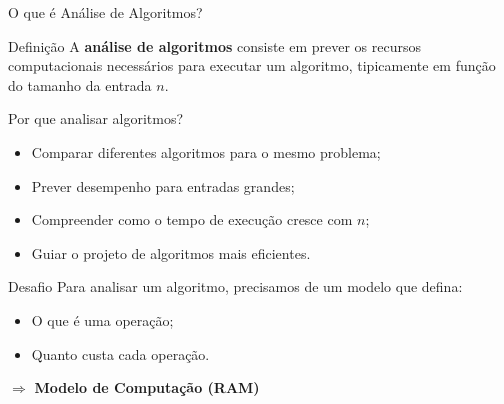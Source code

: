\documentclass{beamer}
\begin{document}
\begin{frame}{O que é Análise de Algoritmos?}

\begin{block}{Definição}
A \textbf{análise de algoritmos} consiste em prever os recursos computacionais necessários para executar um algoritmo, tipicamente em função do tamanho da entrada $n$.
\end{block}

\vspace{0.3cm}

\begin{block}{Por que analisar algoritmos?}
\begin{itemize}
    \item Comparar diferentes algoritmos para o mesmo problema;
    \item Prever desempenho para entradas grandes;
    \item Compreender como o tempo de execução cresce com $n$;
    \item Guiar o projeto de algoritmos mais eficientes.
\end{itemize}
\end{block}

\vspace{0.3cm}

\begin{alertblock}{Desafio}
Para analisar um algoritmo, precisamos de um modelo que defina:
\begin{itemize}
    \item O que é uma operação;
    \item Quanto custa cada operação.
\end{itemize}
\end{alertblock}

\vspace{0.2cm}

\centering
$\Rightarrow$ \textbf{Modelo de Computação (RAM)}

\end{frame}
\end{document}
